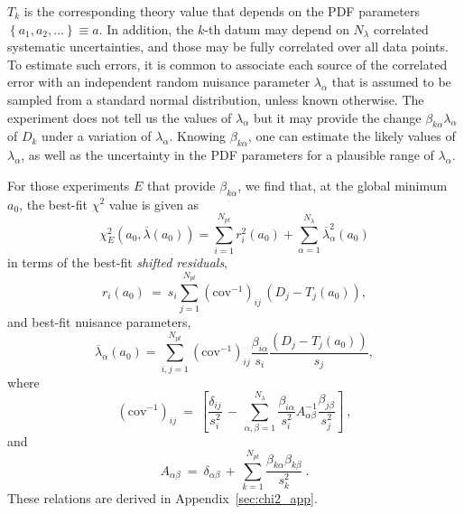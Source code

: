 $T_{k}$ is the corresponding theory value that depends on the PDF
parameters $\left\{a_1,a_2,...\right\}\equiv a$. In addition, the $k$-th datum may depend on
$N_{\lambda}$ correlated systematic uncertainties, and those may
be fully correlated over all data points. To estimate such errors,
it is common to associate each source of the correlated error with
an independent random nuisance parameter $\lambda_{\alpha}$ that is assumed to
be sampled from a standard normal distribution, unless known
otherwise. The experiment does not tell us the values of
$\lambda_{\alpha}$
but it may provide
the change $\beta_{k\alpha}\lambda_\alpha$ of $D_k$ under a variation of $\lambda_{\alpha}$. Knowing $\beta_{k\alpha}$,
one can estimate the likely values of $\lambda_{\alpha}$, as well
as the uncertainty in the PDF parameters for a plausible range of
$\lambda_{\alpha}$.


For those experiments $E$ that provide
$\beta_{k\alpha}$, we find that, at the global minimum $a_0$,
the best-fit $\chi^2$ value is given as
\begin{equation}
\chi^{2}_E (a_{0},\overline \lambda(a_0))=
\sum_{i=1}^{N_{pt}} r_i^2(a_0)
+\sum_{\alpha=1}^{N_\lambda}\overline\lambda^2_\alpha(a_0) \label{Chi2a0l0}
\end{equation}
in terms of the best-fit {\it shifted residuals},
\begin{equation}
  r_{i}(a_0)\  =\ s_{i}\sum_{j=1}^{N_{\mathit{pt}}}(\mathrm{cov}^{-1})_{ij}\,\left(D_{j}-T_{j}(a_0)\right),\label{eq:res-cov}
\end{equation}
and best-fit nuisance parameters,
\begin{equation}
\overline{\lambda}_{\alpha}(a_0) =\sum_{i,j=1}^{N_{\mathit{pt}}}(\mathrm{cov}^{-1})_{ij}\frac{\beta_{i\alpha}}{s_{i}}\frac{\left(D_{j}-T_{j}(a_0)\right)}{s_{j}},
\label{eq:lam-cov}
\end{equation}
where
\begin{equation}
(\mathrm{cov}^{-1})_{ij}\ =\ \left[\frac{\delta_{ij}}{s_{i}^{2}}\,-\,\sum_{\alpha,\beta=1}^{N_{\lambda}}\frac{\beta_{i\alpha}}{s_{i}^{2}}A_{\alpha\beta}^{-1}\frac{\beta_{j\beta}}{s_{j}^{2}}\right]\ ,\label{eq:covmat}
\end{equation}
and
\begin{equation}
A_{\alpha\beta}\ =\ \delta_{\alpha\beta}\,+\,\sum_{k=1}^{N_{\mathit{pt}}}\frac{\beta_{k\alpha}\beta_{k\beta}}{s_{k}^{2}}\ .
\end{equation}
These relations are derived in Appendix~\ref{sec:chi2_app}.

